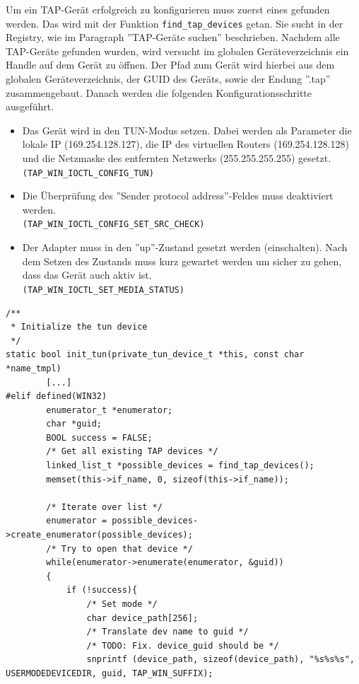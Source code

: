 {Um ein TAP-Gerät erfolgreich zu konfigurieren muss zuerst eines gefunden werden. Das wird mit der Funktion
\texttt{find\_tap\_devices} getan. Sie sucht in der Registry, wie im Paragraph ''TAP-Geräte suchen''
beschrieben.
Nachdem alle TAP-Geräte gefunden wurden, wird versucht im globalen Geräteverzeichnis ein Handle
auf dem Gerät zu öffnen. Der Pfad zum Gerät wird hierbei aus dem globalen Geräteverzeichnis, der GUID des Geräts,
sowie der Endung ''.tap'' zusammengebaut.
Danach werden die folgenden Konfigurationsschritte ausgeführt.
\begin{itemize}
\item Das Gerät wird in den TUN-Modus setzen. Dabei werden als Parameter
die lokale IP (169.254.128.127), die IP des virtuellen Routers (169.254.128.128)
und die Netzmaske des entfernten Netzwerks (255.255.255.255) gesetzt. 
\texttt{(TAP\_WIN\_IOCTL\_CONFIG\_TUN)}
\item Die Überprüfung des ''Sender protocol address''-Feldes muss deaktiviert werden.\\
\texttt{(TAP\_WIN\_IOCTL\_CONFIG\_SET\_SRC\_CHECK)}
\item Der Adapter muss in den ''up''-Zustand gesetzt werden (einschalten). 
Nach dem Setzen des Zustands muss kurz gewartet werden um sicher zu gehen, dass das Gerät auch aktiv ist.\\
\texttt{(TAP\_WIN\_IOCTL\_SET\_MEDIA\_STATUS)}
\end{itemize}


\begin{lstlisting}[caption=Konfiguration eines TAP-Geräts,label=lst:tap-device-configuration]
/**
 * Initialize the tun device
 */
static bool init_tun(private_tun_device_t *this, const char *name_tmpl)
        [...]
#elif defined(WIN32)
        enumerator_t *enumerator;
        char *guid;
        BOOL success = FALSE;
        /* Get all existing TAP devices */
        linked_list_t *possible_devices = find_tap_devices();
        memset(this->if_name, 0, sizeof(this->if_name));

        /* Iterate over list */
        enumerator = possible_devices->create_enumerator(possible_devices);
        /* Try to open that device */
        while(enumerator->enumerate(enumerator, &guid))
        {
            if (!success){
                /* Set mode */
                char device_path[256];
                /* Translate dev name to guid */
                /* TODO: Fix. device_guid should be */
                snprintf (device_path, sizeof(device_path), "%s%s%s", USERMODEDEVICEDIR, guid, TAP_WIN_SUFFIX);


\end{lstlisting}}
